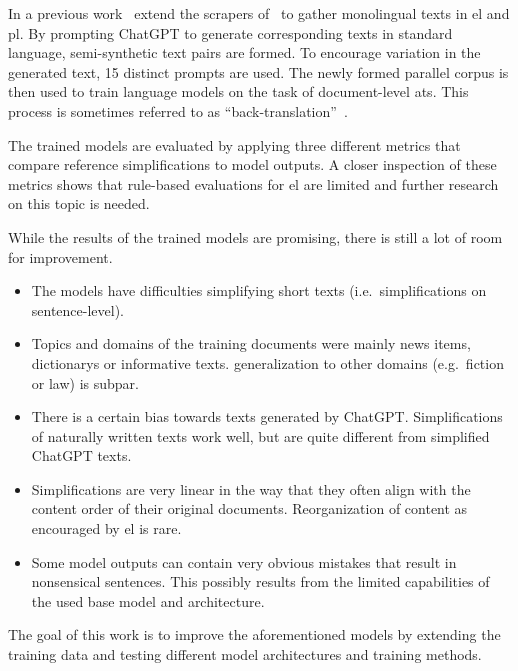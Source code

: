In a previous work~\textcite{klöser2024german} extend the scrapers of~\textcite{Ansch_tz_2023} to gather monolingual texts in \gls{el} and \gls{pl}.
By prompting ChatGPT to generate corresponding texts in standard language, semi-synthetic text pairs are formed.
To encourage variation in the generated text, 15 distinct prompts are used.
The newly formed parallel corpus is then used to train language models on the task of document-level \gls{ats}.
This process is sometimes referred to as \enquote{back-translation}~\autocite{sennrich-etal-2016-improving}.

The trained models are evaluated by applying three different metrics that compare reference simplifications to model outputs.
A closer inspection of these metrics shows that rule-based evaluations for \gls{el} are limited and further research on this topic is needed.

While the results of the trained models are promising, there is still a lot of room for improvement.
\begin{itemize}[noitemsep]
    \item The models have difficulties simplifying short texts (i.e.\ simplifications on sentence-level).
    \item Topics and domains of the training documents were mainly news items, dictionarys or informative texts.
    \gls{generalization} to other domains (e.g.\ fiction or law) is subpar.
    \item There is a certain bias towards texts generated by ChatGPT.
    Simplifications of naturally written texts work well, but are quite different from simplified ChatGPT texts.
    \item Simplifications are very linear in the way that they often align with the content order of their original documents.
    Reorganization of content as encouraged by \gls{el} is rare.
    \item Some model outputs can contain very obvious mistakes that result in nonsensical sentences.
    This possibly results from the limited capabilities of the used base model and architecture.
\end{itemize}

The goal of this work is to improve the aforementioned models by extending the training data and testing different model architectures and training methods.


%

